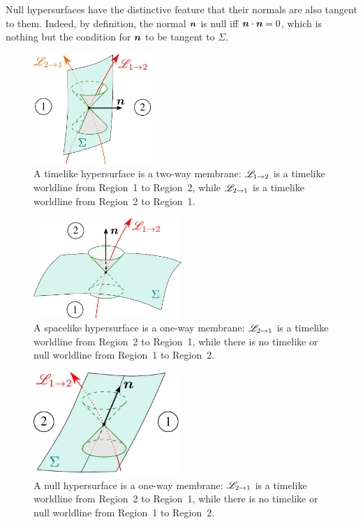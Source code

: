 \begin{remark}
Null hypersurfaces have the distinctive feature that their normals are
also tangent to them. Indeed, by definition, the normal $\bm{n}$ is null iff
$\bm{n}\cdot\bm{n}=0$, which is nothing but the condition
for $\bm{n}$ to be tangent to $\Sigma$.
\end{remark}

\begin{figure}
\centerline{\includegraphics[width=0.4\textwidth]{def_timelike_2way.pdf}}
\caption[]{\label{f:def:timelike_2way} \footnotesize
A timelike hypersurface is a two-way membrane: $\mathscr{L}_{1\rightarrow 2}$ is
a timelike worldline from Region~1 to Region~2, while $\mathscr{L}_{2\rightarrow 1}$ is
a timelike worldline from Region~2 to Region~1.}
\end{figure}

\begin{figure}
\centerline{\includegraphics[width=0.5\textwidth]{def_spacelike_1way.pdf}}
\caption[]{\label{f:def:spacelike_1way} \footnotesize
A spacelike hypersurface is a one-way membrane: $\mathscr{L}_{2\rightarrow 1}$ is
a timelike worldline from Region~2 to Region~1, while there is no timelike or null
worldline from Region~1 to Region~2.}
\end{figure}

\begin{figure}
\centerline{\includegraphics[width=0.5\textwidth]{def_null_1way.pdf}}
\caption[]{\label{f:def:null_1way} \footnotesize
A null hypersurface is a one-way membrane: $\mathscr{L}_{2\rightarrow 1}$ is
a timelike worldline from Region~2 to Region~1, while there is no timelike or null
worldline from Region~1 to Region~2.}
\end{figure}

